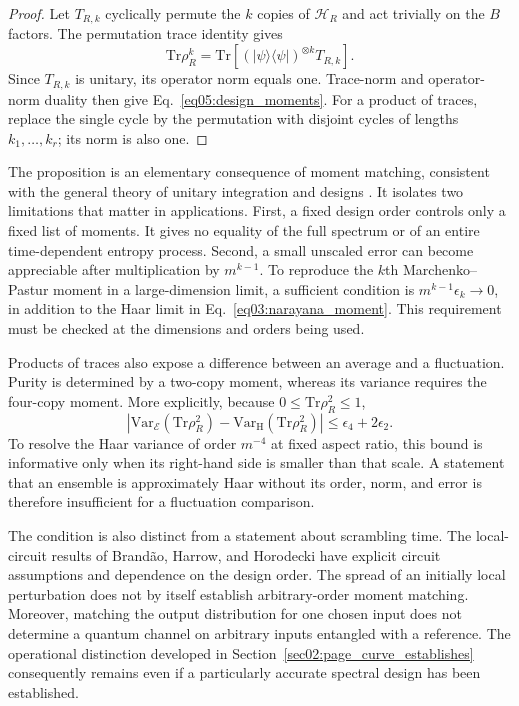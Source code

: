 \documentclass[11pt,letterpaper]{article}
\theoremstyle{plain}
\theoremstyle{definition}
\theoremstyle{remark}
\begin{document}
\begin{proof}
Let $T_{R,k}$ cyclically permute the $k$ copies of $\mathcal H_R$ and
act trivially on the $B$ factors.  The permutation trace identity gives
\begin{equation}
\label{eq05:swap_identity}
 \mathrm{Tr}\rho_R^k
 =\mathrm{Tr}\!\left[
   (|\psi\rangle\langle\psi|)^{\otimes k}T_{R,k}\right].
\end{equation}
Since $T_{R,k}$ is unitary, its operator norm equals one.  Trace-norm
and operator-norm duality then give Eq.~\eqref{eq05:design_moments}.
For a product of traces, replace the single cycle by the permutation
with disjoint cycles of lengths $k_1,\ldots,k_r$; its norm is also one.
\end{proof}

The proposition is an elementary consequence of moment matching,
consistent with the general theory of unitary integration and designs
\cite{collinssniady2006,brandaoetal2016}.  It isolates two limitations
that matter in applications.  First, a fixed design order controls only
a fixed list of moments.  It gives no equality of the full spectrum
or of an entire time-dependent entropy process.  Second, a small
unscaled error can become appreciable after multiplication by
$m^{k-1}$.  To reproduce the $k$th Marchenko--Pastur moment in a
large-dimension limit, a sufficient condition is
$m^{k-1}\epsilon_k\to0$, in addition to the Haar limit in
Eq.~\eqref{eq03:narayana_moment}.  This requirement must be checked
at the dimensions and orders being used.

Products of traces also expose a difference between an average and a
fluctuation.  Purity is determined by a two-copy moment, whereas its
variance requires the four-copy moment.  More explicitly, because
$0\leq\mathrm{Tr}\rho_R^2\leq1$,
\begin{equation}
\label{eq05:variance_design_bound}
 \left|\mathrm{Var}_{\mathcal E}(\mathrm{Tr}\rho_R^2)
       -\mathrm{Var}_{\mathrm H}(\mathrm{Tr}\rho_R^2)\right|
 \leq\epsilon_4+2\epsilon_2.
\end{equation}
To resolve the Haar variance of order $m^{-4}$ at fixed aspect ratio,
this bound is informative only when its right-hand side is smaller
than that scale.  A statement that an ensemble is approximately Haar
without its order, norm, and error is therefore insufficient for a
fluctuation comparison.

The condition is also distinct from a statement about scrambling time.
The local-circuit results of Brand\~ao, Harrow, and Horodecki
\cite{brandaoetal2016} have explicit circuit assumptions and dependence
on the design order.  The spread of an initially local perturbation
does not by itself establish arbitrary-order moment matching.  Moreover,
matching the output distribution for one chosen input does not determine
a quantum channel on arbitrary inputs entangled with a reference.
The operational distinction developed in
Section~\ref{sec02:page_curve_establishes} consequently remains even
if a particularly accurate spectral design has been established.
\end{document}

